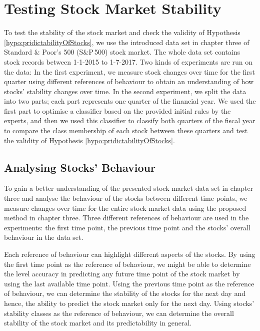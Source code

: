 \section{Testing Stock Market Stability}

To test the stability of the stock market and check the validity of Hypothesis  \ref{hypo:pridictabilityOfStocks}, we use the introduced data set in chapter three of Standard \& Poor's 500 (S\&P\,500) stock market. The whole data set contains stock records between 1-1-2015 to 1-7-2017. Two kinds of experiments are run on the data: In the first experiment, we measure stock changes over time for the first quarter using different references of behaviour to obtain an understanding of how stocks' stability changes over time. In the second experiment, we split the data into two parts; each part represents one quarter of the financial year. We used the first part to optimise a classifier based on the provided initial rules by the experts, and then we used this classifier to classify both quarters of the fiscal year to compare the class membership of each stock between these quarters and test the validity of Hypothesis  \ref{hypo:pridictabilityOfStocks}.

\subsection{Analysing Stocks' Behaviour}

To gain a better understanding of the presented stock market data set in chapter three and analyse the behaviour of the stocks between different time points, we measure changes over time for the entire stock market data using the proposed method in chapter three. Three different references of behaviour are used in the experiments: the first time point, the previous time point and the stocks' overall behaviour in the data set.


Each reference of behaviour can highlight different aspects of the stocks. By using the first time point as the reference of behaviour, we might be able to determine the level accuracy in predicting any future time point of the stock market by using the last available time point. Using the previous time point as the reference of behaviour, we can determine the stability of the stocks for the next day and hence, the ability to predict the stock market only for the next day. Using stocks' stability classes as the reference of behaviour, we can determine the overall stability of the stock market and its predictability in general.


